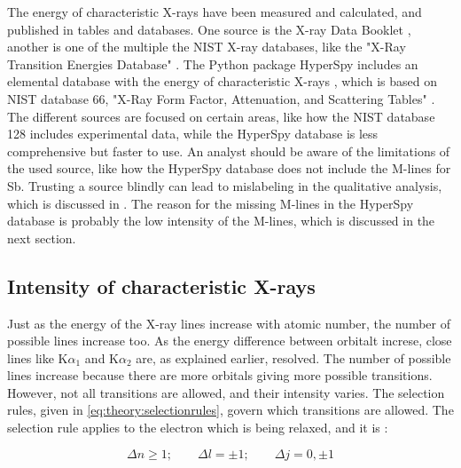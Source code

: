 The energy of characteristic X-rays have been measured and calculated, and published in tables and databases.
One source is the X-ray Data Booklet \cite{thompson_x-ray_2004}, another is one of the multiple the NIST X-ray databases, like the "X-Ray Transition Energies Database" \cite{nist_xraydatabase}.
The Python package HyperSpy includes an elemental database with the energy of characteristic X-rays \cite{hyperspy_1.7.1}, which is based on NIST database 66, "X-Ray Form Factor, Attenuation, and Scattering Tables" \cite{nist_xraydatabase_hyperspy}.
The different sources are focused on certain areas, like how the NIST database 128 includes experimental data, while the HyperSpy database is less comprehensive but faster to use.
An analyst should be aware of the limitations of the used source, like how the HyperSpy database does not include the M-lines for Sb.
Trusting a source blindly can lead to mislabeling in the qualitative analysis, which is discussed in .
The reason for the missing M-lines in the HyperSpy database is probably the low intensity of the M-lines, which is discussed in the next section.



\subsection{Intensity of characteristic X-rays}
\label{theory:xray_formation:intensity}

Just as the energy of the X-ray lines increase with atomic number, the number of possible lines increase too.
As the energy difference between orbitalt increse, close lines like K$\alpha_1$ and K$\alpha_2$ are, as explained earlier, resolved.
The number of possible lines increase because there are more orbitals giving more possible transitions.
However, not all transitions are allowed, and their intensity varies.
The selection rules, given in \cref{eq:theory:selectionrules}, govern which transitions are allowed.
The selection rule applies to the electron which is being relaxed, and it is \cite[Sec. 8.2.2.2]{hollas_modern_2004}:

\begin{equation}
    \label{eq:theory:selectionrules}
    \Delta n \ge 1;\qquad \Delta l  = \pm 1;\qquad \Delta j = 0, \pm 1
\end{equation}

